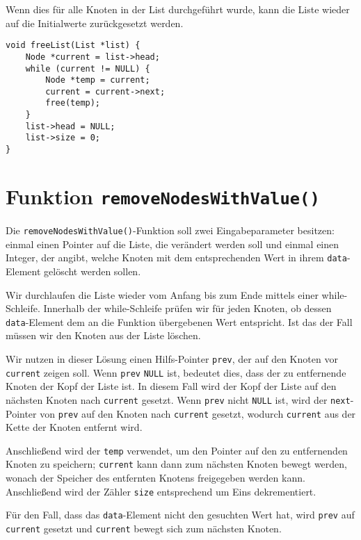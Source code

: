 Wenn dies für alle Knoten in der List durchgeführt wurde, kann die Liste wieder
auf die Initialwerte zurückgesetzt werden.

\begin{verbatim}
void freeList(List *list) {
    Node *current = list->head;
    while (current != NULL) {
        Node *temp = current;
        current = current->next;
        free(temp);
    }
    list->head = NULL;
    list->size = 0;
}
\end{verbatim}

\section*{Funktion \texttt{removeNodesWithValue()}}

Die \texttt{removeNodesWithValue()}-Funktion soll zwei Eingabeparameter
besitzen: einmal einen Pointer auf die Liste, die verändert werden soll und
einmal einen Integer, der angibt, welche Knoten mit dem entsprechenden Wert in
ihrem \texttt{data}-Element gelöscht werden sollen.

Wir durchlaufen die Liste wieder vom Anfang bis zum Ende mittels einer
while-Schleife. Innerhalb der while-Schleife prüfen wir für jeden Knoten, ob
dessen \texttt{data}-Element dem an die Funktion übergebenen Wert
entspricht. Ist das der Fall müssen wir den Knoten aus der Liste löschen.

Wir nutzen in dieser Lösung einen Hilfs-Pointer \texttt{prev}, der auf
den Knoten vor \texttt{current} zeigen soll. Wenn \texttt{prev}
\texttt{NULL} ist, bedeutet dies, dass der zu entfernende Knoten der Kopf
der Liste ist. In diesem Fall wird der Kopf der Liste auf den nächsten Knoten
nach \texttt{current} gesetzt. Wenn \texttt{prev} nicht
\texttt{NULL} ist, wird der \texttt{next}-Pointer von
\texttt{prev} auf den Knoten nach \texttt{current} gesetzt,
wodurch \texttt{current} aus der Kette der Knoten entfernt wird.

Anschließend wird der \texttt{temp} verwendet, um den Pointer auf den zu
entfernenden Knoten zu speichern; \texttt{current} kann dann zum nächsten
Knoten bewegt werden, wonach der Speicher des entfernten Knotens freigegeben
werden kann. Anschließend wird der Zähler \texttt{size} entsprechend um
Eins dekrementiert.

Für den Fall, dass das \texttt{data}-Element nicht den gesuchten Wert
hat, wird \texttt{prev} auf \texttt{current} gesetzt und
\texttt{current} bewegt sich zum nächsten Knoten.

